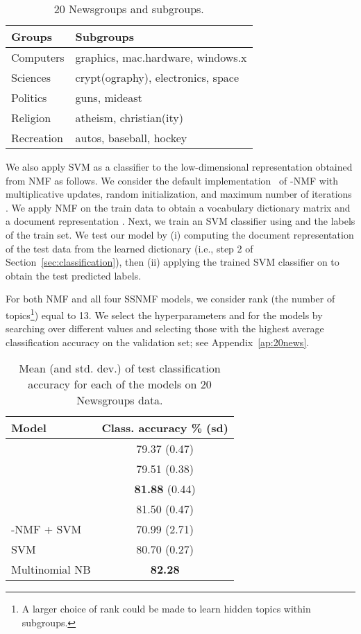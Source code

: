 \documentclass[twocolumn,10pt]{article}
\begin{document}
\begin{table}[tb]
\centering
\footnotesize

\caption{20 Newsgroups and subgroups.}\label{table:20news_data}
{ \renewcommand{\arraystretch}{1.15}
\begin{tabular}{ l  l }
            \hline
            Groups &\qquad Subgroups \\
            \hline
            Computers &\qquad graphics, mac.hardware, windows.x\\
            Sciences &\qquad crypt(ography), electronics, space\\
            Politics &\qquad guns, mideast \\
            Religion &\qquad atheism, christian(ity)\\
            Recreation &\qquad autos, baseball, hockey\\
\hline
\end{tabular}}
\end{table}



We also apply SVM as a classifier to the low-dimensional representation obtained from NMF as follows.
We consider the default implementation~\cite{scikit-learn} of -NMF  with multiplicative updates, random initialization, and maximum number of iterations . 
We apply NMF on the train data to obtain a vocabulary dictionary matrix  and a document representation .
Next, we train an SVM classifier using  and the labels of the train set.
We test our model by (i) computing the document representation of the test data  from the learned dictionary  (i.e., step 2 of Section~\ref{sec:classification}), then (ii) applying the trained SVM classifier on  to obtain the test predicted labels.

For both NMF and all four SSNMF models, we consider rank (the number of topics\footnote{A larger choice of rank could be made to learn hidden topics within subgroups.}) equal to 13.
We select the hyperparameters  and  for the models by searching over different values and selecting those with the highest average classification accuracy on the validation set; see Appendix~\ref{ap:20news}. 

\begin{table}[htb]
\centering
\caption{Mean (and std. dev.) of test classification accuracy for each of the models on 20 Newsgroups data.}\label{table:class_accuracy}
{ \renewcommand{\arraystretch}{1.15}
\footnotesize
\begin{tabular}{ |l|c| } 
\hline
Model & Class. accuracy \% (sd) \\
\hline
 & 79.37 (0.47)  \\ 
  &79.51 (0.38)  \\ 
 & \textbf{81.88} (0.44)  \\ 
 & 81.50 (0.47)  \\
-NMF + SVM & 70.99 (2.71)  \\
\hline
SVM &  80.70 (0.27)  \\
Multinomial NB  &  \textbf{82.28} \\
\hline
\end{tabular}}
\end{table}
\end{document}
